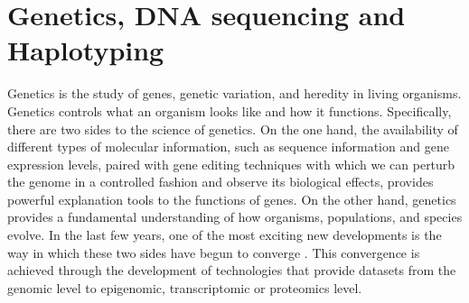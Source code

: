 \section{Genetics, DNA sequencing and Haplotyping}\label{sec:dna_seq}
Genetics is the study of genes, genetic variation, and heredity in living organisms. 
Genetics controls what an organism looks like and how it functions.
Specifically, there are two sides to the science of genetics.
On the one hand, the availability of different types of molecular information, such as sequence information and gene expression levels, paired with gene editing techniques with which we can perturb the genome in a controlled fashion and observe its biological effects, 
provides powerful explanation tools to the functions of genes.
On the other hand, genetics provides a fundamental understanding of how organisms, populations, and species evolve. 
In the last few years, one of the most exciting new developments is the way in which these two sides have begun to converge \citep{casillas2017molecular}.
This convergence is achieved through the development of technologies that provide datasets from the genomic level to epigenomic, transcriptomic or proteomics level.


